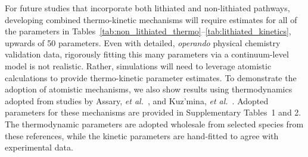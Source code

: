 \documentclass{elsarticle}
\begin{document}
For future studies that incorporate both lithiated and non-lithiated pathways, developing combined thermo-kinetic mechanisms will require estimates for all of the parameters in Tables~\ref{tab:non_lithiated_thermo}--\ref{tab:lithiated_kinetics}, upwards of 50 parameters. Even with detailed, \textit{operando} physical chemistry validation data, rigorously fitting this many parameters via a continuum-level model is not realistic.  Rather, simulations will need to leverage atomistic calculations to provide thermo-kinetic parameter estimates. To demonstrate the adoption of atomistic mechanisms, we also show results using thermodynamics adopted from studies by Assary, \textit{et al.}~\cite{assary2014}, and Kuz'mina, \textit{et al.}~\cite{kuzmina2019}.  Adopted parameters for these mechanisms are provided in Supplementary Tables~1 and 2.  The thermodynamic parameters are adopted wholesale from selected species from these references, while the kinetic parameters are hand-fitted to agree with experimental data.
\end{document}
